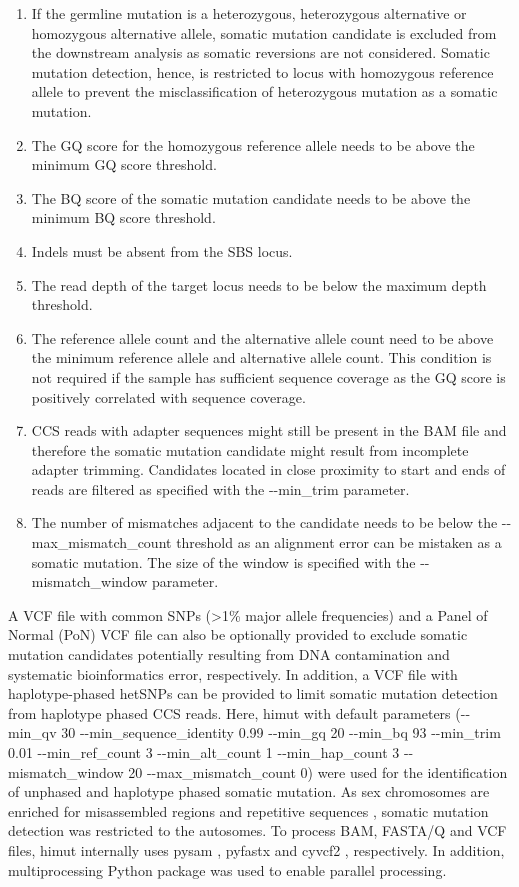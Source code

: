 \begin{enumerate}
\item If the germline mutation is a heterozygous, heterozygous alternative or homozygous alternative allele, somatic mutation candidate is excluded from the downstream analysis as somatic reversions are not considered. Somatic mutation detection, hence, is restricted to locus with homozygous reference allele to prevent the misclassification of heterozygous mutation as a somatic mutation.
\item The GQ score for the homozygous reference allele needs to be above the minimum GQ score threshold.
\item The BQ score of the somatic mutation candidate needs to be above the minimum BQ score threshold.
\item Indels must be absent from the SBS locus.
\item The read depth of the target locus needs to be below the maximum depth threshold.
\item The reference allele count and the alternative allele count need to be above the minimum reference allele and alternative allele count. This condition is not required if the sample has sufficient sequence coverage as the GQ score is positively correlated with sequence coverage.
\item CCS reads with adapter sequences might still be present in the BAM file and therefore the  somatic mutation candidate might result from incomplete adapter trimming. Candidates located in close proximity to start and ends of reads are filtered as specified with the -{}-min\_trim parameter. 
\item The number of mismatches adjacent to the candidate needs to be below the -{}-max\_mismatch\_count threshold as an alignment error can be mistaken as a somatic mutation. The size of the window is specified with the -{}-mismatch\_window parameter. 
\end{enumerate}

A VCF file with common SNPs (>1\% major allele frequencies) and a Panel of Normal (PoN) VCF file can also be optionally provided to exclude somatic mutation candidates potentially resulting from DNA contamination and systematic bioinformatics error, respectively. In addition, a VCF file with haplotype-phased hetSNPs can be provided to limit somatic mutation detection from haplotype phased CCS reads. Here, himut with default parameters (-{}-min\_qv 30 -{}-min\_sequence\_identity 0.99 -{}-min\_gq 20 -{}-min\_bq 93 -{}-min\_trim 0.01 -{}-min\_ref\_count 3 -{}-min\_alt\_count 1 -{}-min\_hap\_count 3 -{}-mismatch\_window 20 -{}-max\_mismatch\_count 0) were used for the identification of unphased and haplotype phased somatic mutation. As sex chromosomes are enriched for misassembled regions and repetitive sequences \cite{}, somatic mutation detection was restricted to the autosomes. To process BAM, FASTA/Q and VCF files, himut internally uses pysam \cite{pysam}, pyfastx \cite{Du2021-ya} and cyvcf2 \cite{Pedersen2017-ld}, respectively. In addition, multiprocessing Python package was used to enable parallel processing.

